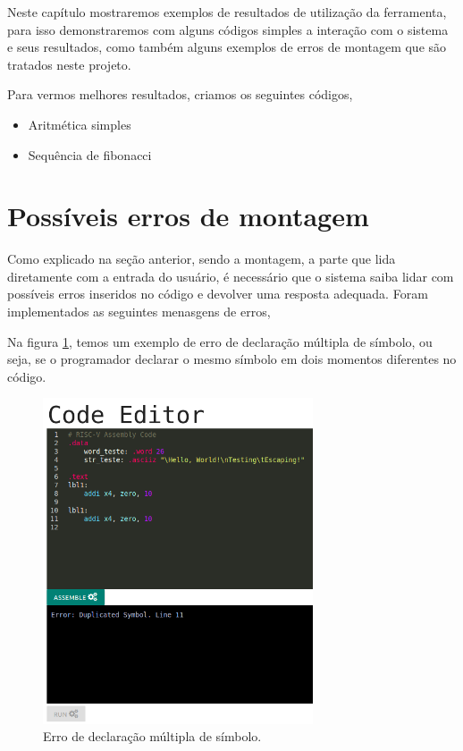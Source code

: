 Neste capítulo mostraremos exemplos de resultados de utilização da ferramenta, para isso demonstraremos com alguns códigos simples a interação com o sistema e seus resultados, como também alguns exemplos de erros de montagem que são tratados neste projeto.

Para vermos melhores resultados, criamos os seguintes códigos,

\begin{itemize}
	\item Aritmética simples
	\item Sequência de fibonacci
\end{itemize}


\section{Possíveis erros de montagem}

	Como explicado na seção anterior, sendo a montagem, a parte que lida diretamente com a entrada do usuário, é necessário que o sistema saiba lidar com possíveis erros inseridos no código e devolver uma resposta adequada. Foram implementados as seguintes menasgens de erros,

	
	 Na figura \ref{fig:assemble_error_duplicated_symbol}, temos um exemplo de erro de declaração múltipla de símbolo, ou seja, se o programador declarar o mesmo símbolo em dois momentos diferentes no código.
	
	\begin{figure}[h!]
	  \centering
	  \includegraphics[width=8cm]{img/assemble_error_duplicated_symbol.png}
	  \caption{Erro de declaração múltipla de símbolo.}
	  \label{fig:assemble_error_duplicated_symbol}
	\end{figure}

